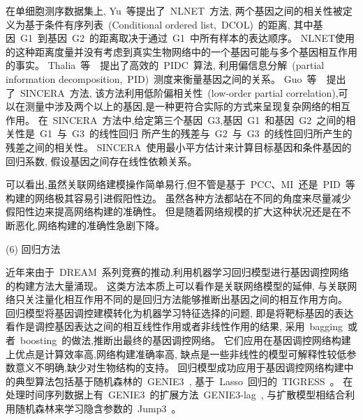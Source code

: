 在单细胞测序数据集上,
Yu~等提出了~NLNET~方法\cite{yu2013hierarchical}, 
两个基因之间的相关性被定义为基于条件有序列表~(Conditional ordered list,~DCOL)~的距离,
其中基因~G1~到基因~G2~的距离取决于通过~G1~中所有样本的表达顺序。
NLNET使用的这种距离度量并没有考虑到真实生物网络中的一个基因可能与多个基因相互作用的事实。
Thalia~等~\cite{chan2017gene}~提出了高效的~PIDC~算法,
利用偏信息分解~(partial information decomposition,~PID)~测度来衡量基因之间的关系。
Guo~等~\cite{guo2015sincera}~提出了~SINCERA~方法, 该方法利用低阶偏相关性~(low-order partial correlation),可以在测量中涉及两个以上的基因,是一种更符合实际的方式来呈现复杂网络的相互作用。
在~SINCERA~方法中,给定第三个基因~G3,基因~G1~和基因~G2~之间的相关性是~G1~与~G3~的线性回归
所产生的残差与~G2~与~G3~的线性回归所产生的残差之间的相关性。
SINCERA~使用最小平方估计来计算目标基因和条件基因的回归系数, 假设基因之间存在线性依赖关系。

可以看出,虽然关联网络建模操作简单易行,但不管是基于~PCC、MI~还是~PID~等构建的网络极其容易引进假阳性边。
虽然各种方法都站在不同的角度来尽量减少假阳性边来提高网络构建的准确性。
但是随着网络规模的扩大这种状况还是在不断恶化,网络构建的准确性急剧下降。

(6) 回归方法

近年来由于~DREAM~系列竞赛的推动,利用机器学习回归模型进行基因调控网络的构建方法大量涌现。
这类方法本质上可以看作是关联网络模型的延伸,
与关联网络只关注量化相互作用不同的是回归方法能够推断出基因之间的相互作用方向。
回归模型将基因调控建模转化为机器学习特征选择的问题,
即是将靶标基因的表达看作是调控基因表达之间的相互线性作用或者非线性作用的结果,
采用~bagging~或者~boosting~的做法,推断出最终的基因调控网络。
它们应用在基因调控网络构建上优点是计算效率高,网络构建准确率高,
缺点是一些非线性的模型可解释性较低参数意义不明确,缺少对生物结构的支持。
回归模型成功应用于基因调控网络构建中的典型算法包括基于随机森林的~GENIE3~\cite{Huynh-Thu2010},
基于~Lasso~回归的~TIGRESS~\cite{Haury2012}。
在处理时间序列数据上有~GENIE3~的扩展方法~GENIE3-lag~\cite{huynh2012machine},
与扩散模型相结合利用随机森林来学习隐含参数的~Jump3~\cite{Huynh-Thu2014}。

